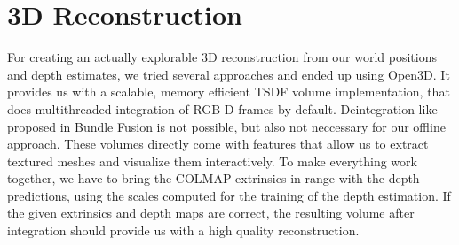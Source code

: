     \section{3D Reconstruction}
        For creating an actually explorable 3D reconstruction from our world positions and depth estimates, we tried several approaches and ended up using Open3D.
        It provides us with a scalable, memory efficient TSDF volume implementation, that does multithreaded integration of RGB-D frames by default.
        Deintegration like proposed in Bundle Fusion is not possible, but also not neccessary for our offline approach.
        These volumes directly come with features that allow us to extract textured meshes and visualize them interactively.
        To make everything work together, we have to bring the COLMAP extrinsics in range with the depth predictions, using the scales computed for the training of the depth estimation.
        If the given extrinsics and depth maps are correct, the resulting volume after integration should provide us with a high quality reconstruction.